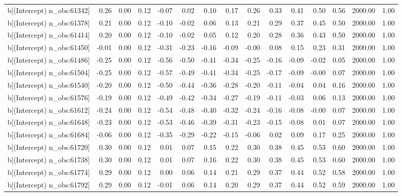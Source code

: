 \begin{table}[ht]
\begin{tabular}{rrrrrrrrrrrrrrr}
  b[(Intercept) n\_obs:61342] & 0.26 & 0.00 & 0.12 & -0.07 & 0.02 & 0.10 & 0.17 & 0.26 & 0.33 & 0.41 & 0.50 & 0.56 & 2000.00 & 1.00 \\ 
  b[(Intercept) n\_obs:61378] & 0.21 & 0.00 & 0.12 & -0.10 & -0.02 & 0.06 & 0.13 & 0.21 & 0.29 & 0.37 & 0.45 & 0.50 & 2000.00 & 1.00 \\ 
  b[(Intercept) n\_obs:61414] & 0.20 & 0.00 & 0.12 & -0.10 & -0.02 & 0.05 & 0.12 & 0.20 & 0.28 & 0.36 & 0.43 & 0.50 & 2000.00 & 1.00 \\ 
  b[(Intercept) n\_obs:61450] & -0.01 & 0.00 & 0.12 & -0.31 & -0.23 & -0.16 & -0.09 & -0.00 & 0.08 & 0.15 & 0.23 & 0.31 & 2000.00 & 1.00 \\ 
  b[(Intercept) n\_obs:61486] & -0.25 & 0.00 & 0.12 & -0.56 & -0.50 & -0.41 & -0.34 & -0.25 & -0.16 & -0.09 & -0.02 & 0.05 & 2000.00 & 1.00 \\ 
  b[(Intercept) n\_obs:61504] & -0.25 & 0.00 & 0.12 & -0.57 & -0.49 & -0.41 & -0.34 & -0.25 & -0.17 & -0.09 & -0.00 & 0.07 & 2000.00 & 1.00 \\ 
  b[(Intercept) n\_obs:61540] & -0.20 & 0.00 & 0.12 & -0.50 & -0.44 & -0.36 & -0.28 & -0.20 & -0.11 & -0.04 & 0.04 & 0.16 & 2000.00 & 1.00 \\ 
  b[(Intercept) n\_obs:61576] & -0.19 & 0.00 & 0.12 & -0.49 & -0.42 & -0.34 & -0.27 & -0.19 & -0.11 & -0.03 & 0.06 & 0.13 & 2000.00 & 1.00 \\ 
  b[(Intercept) n\_obs:61612] & -0.24 & 0.00 & 0.12 & -0.54 & -0.48 & -0.40 & -0.32 & -0.24 & -0.16 & -0.08 & -0.00 & 0.07 & 2000.00 & 1.00 \\ 
  b[(Intercept) n\_obs:61648] & -0.23 & 0.00 & 0.12 & -0.53 & -0.46 & -0.39 & -0.31 & -0.23 & -0.15 & -0.08 & 0.01 & 0.07 & 2000.00 & 1.00 \\ 
  b[(Intercept) n\_obs:61684] & -0.06 & 0.00 & 0.12 & -0.35 & -0.29 & -0.22 & -0.15 & -0.06 & 0.02 & 0.09 & 0.17 & 0.25 & 2000.00 & 1.00 \\ 
  b[(Intercept) n\_obs:61720] & 0.30 & 0.00 & 0.12 & 0.01 & 0.07 & 0.15 & 0.22 & 0.30 & 0.38 & 0.45 & 0.53 & 0.60 & 2000.00 & 1.00 \\ 
  b[(Intercept) n\_obs:61738] & 0.30 & 0.00 & 0.12 & 0.01 & 0.07 & 0.16 & 0.22 & 0.30 & 0.38 & 0.45 & 0.53 & 0.60 & 2000.00 & 1.00 \\ 
  b[(Intercept) n\_obs:61774] & 0.29 & 0.00 & 0.12 & 0.00 & 0.06 & 0.14 & 0.21 & 0.29 & 0.37 & 0.44 & 0.52 & 0.58 & 2000.00 & 1.00 \\ 
  b[(Intercept) n\_obs:61792] & 0.29 & 0.00 & 0.12 & -0.01 & 0.06 & 0.14 & 0.20 & 0.29 & 0.37 & 0.44 & 0.52 & 0.59 & 2000.00 & 1.00 \\ 

\end{tabular}
\end{table}
